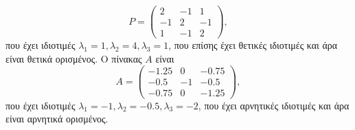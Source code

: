 \begin{solution}
\[        P =
        \begin{pmatrix}
            2 & -1 & 1 \\
            -1 & 2 & -1 \\
            1 & -1 & 2
        \end{pmatrix},
    \]
    που έχει ιδιοτιμές \( \lambda_1 = 1, \lambda_2 = 4, \lambda_3 = 1 \), που
    επίσης έχει θετικές ιδιοτιμές και άρα είναι θετικά ορισμένος. Ο πίνακας
    \( A \) είναι
    \[
        A =
        \begin{pmatrix}
            -1.25 & 0 & -0.75 \\
            -0.5 & -1 & -0.5 \\
            -0.75 & 0 & -1.25
        \end{pmatrix},
    \]
    που έχει ιδιοτιμές \( \lambda_1 = -1, \lambda_2 = -0.5, \lambda_3 = -2 \), που
    έχει αρνητικές ιδιοτιμές και άρα είναι αρνητικά ορισμένος.
\end{solution}
